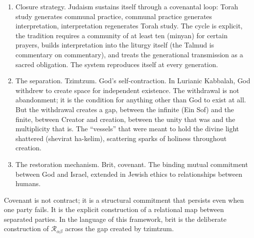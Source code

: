 \documentclass[
]{article}
\providecommand{\tightlist}{%
  \setlength{\itemsep}{0pt}\setlength{\parskip}{0pt}}
\begin{document}
\begin{enumerate}
\def\labelenumi{\arabic{enumi}.}
\setcounter{enumi}{16}
\tightlist
\item
  Closure strategy. Judaism sustains itself through a covenantal loop:
  Torah study generates communal practice, communal practice generates
  interpretation, interpretation regenerates Torah study. The cycle is
  explicit, the tradition requires a community of at least ten (minyan)
  for certain prayers, builds interpretation into the liturgy itself
  (the Talmud is commentary on commentary), and treats the generational
  transmission as a sacred obligation. The system reproduces itself at
  every generation.
\item
  The separation. Tzimtzum. God's self-contraction. In Lurianic
  Kabbalah, God withdrew to create space for independent existence. The
  withdrawal is not abandonment; it is the condition for anything other
  than God to exist at all. But the withdrawal creates a gap, between
  the infinite (Ein Sof) and the finite, between Creator and creation,
  between the unity that was and the multiplicity that is. The
  ``vessels'' that were meant to hold the divine light shattered
  (shevirat ha-kelim), scattering sparks of holiness throughout
  creation.
\item
  The restoration mechanism. Brit, covenant. The binding mutual
  commitment between God and Israel, extended in Jewish ethics to
  relationships between humans.
\end{enumerate}

Covenant is not contract; it is a structural commitment that persists
even when one party fails. It is the explicit construction of a
relational map between separated parties. In the language of this
framework, brit is the deliberate construction of
\(\mathcal{R}_{\alpha\beta}\) across the gap created by tzimtzum.
\end{document}
